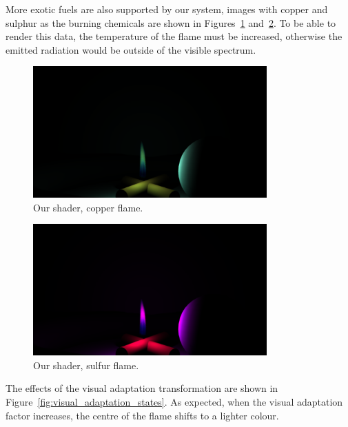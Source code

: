 More exotic fuels are also supported by our system, images with copper and sulphur as the burning chemicals are shown in Figures~\ref{fig:result_copper} and~\ref{fig:result_sulfur}.
To be able to render this data, the temperature of the flame must be increased, otherwise the emitted radiation would be outside of the visible spectrum.

\begin{figure}[htbp]
	\centering
	\includegraphics[width=0.8\textwidth, trim={8cm 0 8cm 10cm}, clip]{img/result_copper}
	\caption{Our shader, copper flame.}
	\label{fig:result_copper}
\end{figure}

\begin{figure}[htbp]
	\centering
	\includegraphics[width=0.8\textwidth, trim={8cm 0 8cm 10cm}, clip]{img/result_sulfur}
	\caption{Our shader, sulfur flame.}
	\label{fig:result_sulfur}
\end{figure}

The effects of the visual adaptation transformation are shown in Figure~\ref{fig:visual_adaptation_states}.
As expected, when the visual adaptation factor increases, the centre of the flame shifts to a lighter colour.

